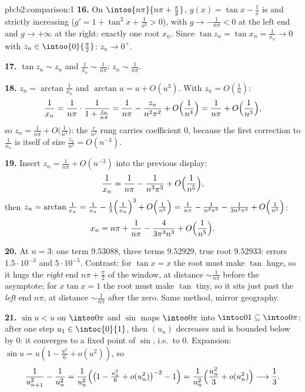 \begin{solution}{pb:b2:comparison:1}
\textbf{16.} On $\intoo{n\pi}{n\pi + \frac\pi2}$, $g(x) = \tan
x - \frac1x$ is  and strictly increasing ($g' = 1 +
\tan^2x + \frac1{x^2} > 0$), with $g \to -\frac1{n\pi} < 0$ at
the left end and $g \to +\infty$ at the right: exactly one
root $x_n$. Since $\tan z_n = \tan x_n = \frac1{x_n} \to 0$
with $z_n \in \intoo{0}{\frac\pi2}$: $z_n \to 0^+$.

\textbf{17.} $\tan z_n \sim z_n$ and $\frac1{x_n} \sim
\frac1{n\pi}$: $z_n \sim \frac1{n\pi}$.

\textbf{18.} $z_n = \arctan\frac1{x_n}$ and $\arctan u = u +
O(u^3)$. With $z_n = O(\frac1n)$:
\[
\frac1{x_n} = \frac{1}{n\pi}\cdot\frac1{1 + \frac{z_n}{n\pi}}
= \frac1{n\pi} - \frac{z_n}{n^2\pi^2} +
O\Bigl(\frac1{n^4}\Bigr)
= \frac1{n\pi} + O\Bigl(\frac1{n^3}\Bigr),
\]
so $z_n = \frac1{n\pi} + O\bigl(\frac1{n^3}\bigr)$: the
$\frac{c}{n^2}$ rung carries coefficient $0$, because the
first correction to $\frac1{x_n}$ is itself of size
$\frac{z_n}{n^2} = O(n^{-3})$.

\textbf{19.} Insert $z_n = \frac1{n\pi} + O(n^{-3})$ into the
previous display:
\[
\frac{1}{x_n} = \frac{1}{n\pi} - \frac{1}{n^3\pi^3} +
O\Bigl(\frac1{n^5}\Bigr),
\]
then $z_n = \arctan\frac1{x_n} = \frac1{x_n} -
\frac{1}{3}\Bigl(\frac1{x_n}\Bigr)^3 + O\Bigl(\frac1{n^5}\Bigr)
= \frac1{n\pi} - \frac{1}{n^3\pi^3} - \frac{1}{3n^3\pi^3} +
O\Bigl(\frac1{n^5}\Bigr)$:
\[
x_n = n\pi + \frac{1}{n\pi} - \frac{4}{3\pi^3n^3} +
O\Bigl(\frac1{n^5}\Bigr).
\]

\textbf{20.} At $n = 3$: one term $9.53088$, three terms
$9.52929$, true root $9.52933$: errors $1.5\cdot10^{-3}$ and
$5\cdot10^{-5}$. Contrast: for $\tan x = x$ the root must make
$\tan$ huge, so it hugs the \emph{right} end $n\pi +
\frac\pi2$ of the window, at distance $\sim\frac1{n\pi}$
before the asymptote; for $x\tan x = 1$ the root must make
$\tan$ tiny, so it sits just past the \emph{left} end $n\pi$,
at distance $\sim\frac1{n\pi}$ after the zero. Same method,
mirror geography.

\textbf{21.} $\sin u < u$ on $\intoo0\pi$ and $\sin$ maps
$\intoo0\pi$ into $\intoc01 \subseteq \intoo0\pi$: after one
step $u_1 \in \intoc{0}{1}$, then $(u_n)$ decreases and is
bounded below by $0$: it converges to a fixed point of $\sin$,
i.e.\ to $0$. Expansion: $\sin u = u(1 - \frac{u^2}6 +
o(u^2))$, so
\[
\frac{1}{u_{n+1}^2} - \frac1{u_n^2}
= \frac{1}{u_n^2}\Bigl(\bigl(1 - \tfrac{u_n^2}6 +
o(u_n^2)\bigr)^{-2} - 1\Bigr)
= \frac{1}{u_n^2}\Bigl(\frac{u_n^2}{3} + o(u_n^2)\Bigr)
\longrightarrow \frac13 .
\]


\end{solution}
